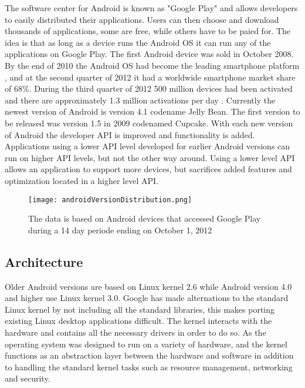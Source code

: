 The software center for Android is known as "Google Play" and allows developers to easily distributed their applications. Users can then choose and download thousands of applications, some are free, while others have to be paied for. The idea is that as long as a device runs the Android OS it can run any of the applications on Google Play. The first Android device was sold in October 2008. By the end of 2010 the Android OS had become the leading smartphone platform \cite{androidLeadingPlatform}, and at the second quarter of 2012 it had a worldwide smartphone market share of 68\%\cite{androidMarketShare}. During the third quarter of 2012 500 million devices had been activated and there are approximately 1.3 million activations per day \cite{androidDevices}. Currently the newest version of Android is version 4.1 codename Jelly Bean. The first version to be released was version 1.5 in 2009 \cite{cupcake} codenamed Cupcake. With each new version of Android the developer API is improved and functionality is added. Applications using a lower API level developed for earlier Android versions can run on higher API levels, but not the other way around. Using a lower level API allows an application to support more devices, but sacrifices added features and optimization located in a higher level API.

\begin{figure}[h!]
  \centering
    \texttt{[image: androidVersionDistribution.png]}
    \caption{\footnotesize The data is based on Android devices that accessed Google Play during a 14 day periode ending on October 1, 2012 \cite{androidVersions}}
\end{figure}


\subsection{Architecture}
Older Android versions are based on Linux kernel 2.6 while Android version 4.0 and higher use Linux kernel 3.0. Google has made alternations to the standard Linux kernel by not including all the standard libraries, this makes porting existing Linux desktop applications difficult. The kernel interacts with the hardware and contains all the necessary drivers in order to do so. As the operating system was designed to run on a variety of hardware, and the kernel functions as an abstraction layer between the hardware and software in addition to handling the standard kernel tasks such as resource management, networking and security.


